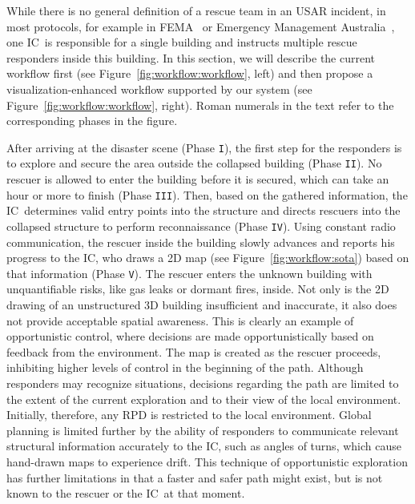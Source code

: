 \documentclass[conference,10pt,letter]{IEEEtran}
\def\IC{IC}
\begin{document}
While there is no general definition of a rescue team in an USAR incident, in most protocols, for example in FEMA~\cite{fema08} or Emergency Management Australia~\cite{em35}, one \IC\ is responsible for a single building and instructs multiple rescue responders inside this building. In this section, we will describe the current workflow first (see Figure~\ref{fig:workflow:workflow}, left) and then propose a visualization-enhanced workflow supported by our system (see Figure~\ref{fig:workflow:workflow}, right). Roman numerals in the text refer to the corresponding phases in the figure.

 After arriving at the disaster scene (Phase \texttt{I}), the first step for the responders is to explore and secure the area outside the collapsed building (Phase \texttt{II}). No rescuer is allowed to enter the building before it is secured, which can take an hour or more to finish (Phase \texttt{III}). Then, based on the gathered information, the \IC\ determines valid entry points into the structure and directs rescuers into the collapsed structure to perform reconnaissance (Phase \texttt{IV}). Using constant radio communication, the rescuer inside the building slowly advances and reports his progress to the \IC, who draws a 2D map (see Figure~\ref{fig:workflow:sota}) based on that information (Phase \texttt{V}). The rescuer enters the unknown building with unquantifiable risks, like gas leaks or dormant fires, inside. Not only is the 2D drawing of an unstructured 3D building insufficient and inaccurate, it also does not provide acceptable spatial awareness. This is clearly an example of opportunistic control, where decisions are made opportunistically based on feedback from the environment. The map is created as the rescuer proceeds, inhibiting higher levels of control in the beginning of the path. Although responders may recognize situations, decisions regarding the path are limited to the extent of the current exploration and to their view of the local environment. Initially, therefore, any RPD is restricted to the local environment. Global planning is limited further by the ability of responders to communicate relevant structural information accurately to the \IC, such as angles of turns, which cause hand-drawn maps to experience drift. This technique of opportunistic exploration has further limitations in that a faster and safer path might exist, but is not known to the rescuer or the \IC\ at that moment.
\end{document}
